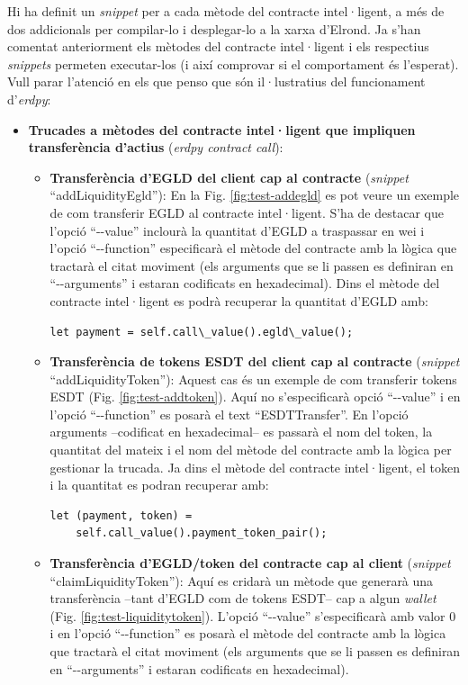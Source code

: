 \documentclass[11pt,a4paper]{article}
\begin{document}
Hi ha definit un \textit{snippet} per a cada mètode del contracte intel·ligent, a més de dos addicionals per compilar-lo i desplegar-lo a la xarxa d'Elrond. Ja s'han comentat anteriorment els mètodes del contracte intel·ligent i els respectius \textit{snippets} permeten executar-los (i així comprovar si el comportament és l'esperat). Vull parar l'atenció en els que penso que són il·lustratius del funcionament d'\textit{erdpy}:
\begin{itemize}
\item \textbf{Trucades a mètodes del contracte intel·ligent que impliquen transferència d'actius} (\textit{erdpy contract call}):
	\begin{itemize}
	\item \textbf{Transferència d'EGLD del client cap al contracte} (\textit{snippet} ``addLiquidityEgld''): En la Fig. \ref{fig:test-addegld} es pot veure un exemple de com transferir EGLD al contracte intel·ligent. S'ha de destacar que l'opció ``-{}-value'' inclourà la quantitat d'EGLD a traspassar en wei i l'opció ``-{}-function'' especificarà el mètode del contracte amb la lògica que tractarà el citat moviment (els arguments que se li passen es definiran en ``-{}-arguments'' i estaran codificats en hexadecimal). Dins el mètode del contracte intel·ligent es podrà recuperar la quantitat d'EGLD amb:
\begin{lstlisting}
let payment = self.call\_value().egld\_value();
\end{lstlisting}
		\item \textbf{Transferència de tokens ESDT del client cap al contracte} (\textit{snippet} ``addLiquidityToken''): Aquest cas és un exemple de com transferir tokens ESDT (Fig. \ref{fig:test-addtoken}). Aquí no s'especificarà opció ``-{}-value'' i en l'opció ``-{}-function'' es posarà el text ``ESDTTransfer''. En l'opció arguments –codificat en hexadecimal– es passarà el nom del token, la quantitat del mateix i el nom del mètode del contracte amb la lògica per gestionar la trucada. Ja dins el mètode del contracte intel·ligent, el token i la quantitat es podran recuperar amb:
\begin{lstlisting}
let (payment, token) =
	self.call_value().payment_token_pair();
\end{lstlisting}
		\item \textbf{Transferència d'EGLD/token del contracte cap al client} (\textit{snippet} ``claimLiquidityToken''): Aquí es cridarà un mètode que generarà una transferència –tant d'EGLD com de tokens ESDT– cap a algun \textit{wallet} (Fig. \ref{fig:test-liquiditytoken}). L'opció ``-{}-value'' s'especificarà amb valor 0 i en l'opció ``-{}-function'' es posarà el mètode del contracte amb la lògica que tractarà el citat moviment (els arguments que se li passen es definiran en ``-{}-arguments'' i estaran codificats en hexadecimal).

\end{itemize}
\end{itemize}
\end{document}
